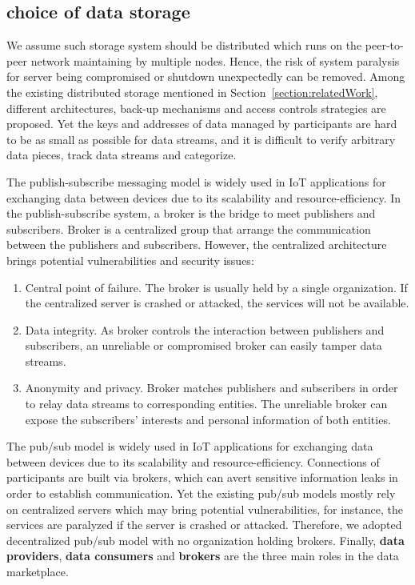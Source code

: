 \subsection{choice of data storage}
We assume such storage system should be distributed which runs on the peer-to-peer network maintaining by multiple nodes. Hence, the risk of system paralysis for server being compromised or shutdown unexpectedly can be removed. Among the existing distributed storage mentioned in Section~\ref{section:relatedWork}, different architectures, back-up mechanisms and access controls strategies are proposed. Yet the keys and addresses of data managed by participants are hard to be as small as possible for data streams, and it is difficult to verify arbitrary data pieces, track data streams and categorize.





The publish-subscribe messaging model is widely used in IoT applications for exchanging data between devices due to its scalability and resource-efficiency. In the publish-subscribe system, a broker is the bridge to meet publishers and subscribers. Broker is a centralized group that arrange the communication between the publishers and subscribers. However, the centralized architecture brings potential vulnerabilities and security issues:

\begin{enumerate}
	\item Central point of failure. 
	The broker is usually held by a single organization. If the centralized server is crashed or attacked, the services will not be available.
	\item Data integrity.
	As broker controls the interaction between publishers and subscribers, an unreliable or compromised broker can easily tamper data streams. 
	\item Anonymity and privacy.
	Broker matches publishers and subscribers in order to relay data streams to corresponding entities. The unreliable broker can expose the subscribers' interests and personal information of both entities.
\end{enumerate}

The pub/sub model is widely used in IoT applications for exchanging data between devices due to its scalability and resource-efficiency. Connections of participants are built via brokers, which can avert sensitive information leaks in order to establish communication. Yet the existing pub/sub models\cite{MQTT, Looci, centralPubSub} mostly rely on centralized servers which may bring potential vulnerabilities, for instance, the services are paralyzed if the server is crashed or attacked. Therefore, we adopted decentralized pub/sub model with no organization holding brokers. Finally, \textbf{data providers}, \textbf{data consumers} and \textbf{brokers} are the three main roles in the data marketplace.

